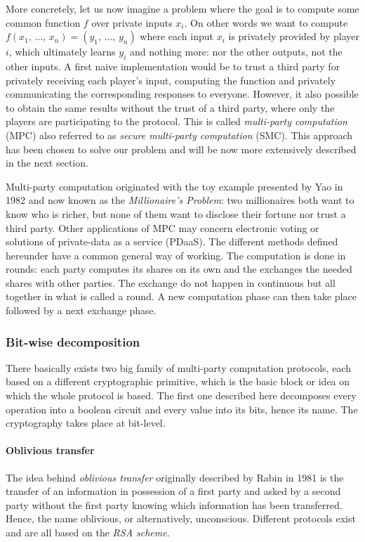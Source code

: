 More concretely, let us now imagine a problem where the goal is to compute some common function $f$ over private inputs $x_i$. On other words we want to compute $f\left(x_1, \, \ldots, \, x_n\right) = \left( y_1, \, \ldots , \, y_n\right)$ where each input $x_i$ is privately provided by player $i$, which ultimately learns $y_i$ and nothing more: nor the other outputs, not the other inputs. A first naive implementation would be to trust a third party for privately receiving each player's input, computing the function and privately communicating the corresponding responses to everyone. However, it also possible to obtain the same results without the trust of a third party, where only the players are participating to the protocol. This is called \emph{multi-party computation} (MPC) also referred to as \emph{secure multi-party computation} (SMC). This approach has been chosen to solve our problem and will be now more extensively described in the next section.

Multi-party computation originated with the toy example presented by Yao in 1982 \cite{Yao1982ProtocolsComputations} and now known as the \emph{Millionaire's Problem}: two millionaires both want to know who is richer, but none of them want to disclose their fortune nor trust a third party. Other applications of MPC may concern electronic voting or solutions of private-data as a service (PDaaS).
The different methods defined hereunder have a common general way of working. The computation is done in rounds: each party computes its shares on its own and the exchanges the needed shares with other parties. The exchange do not happen in continuous but all together in what is called a round. A new computation phase can then take place followed by a next exchange phase.


\subsubsection{Bit-wise decomposition}
There basically exists two big family of multi-party computation protocols, each based on a different cryptographic primitive, which is the basic block or idea on which the whole protocol is based. The first one described here decomposes every operation into a boolean circuit and every value into its bits, hence its name. The cryptography takes place at bit-level.

\paragraph{Oblivious transfer}
The idea behind \emph{oblivious transfer} originally described by Rabin in 1981 \cite{Rabin1981HowTransfer.} is the transfer of an information in possession of a first party and asked by a second party without the first party knowing which information has been transferred. Hence, the name oblivious, or alternatively, unconscious. Different protocols exist and are all based on the \emph{RSA scheme}. 

